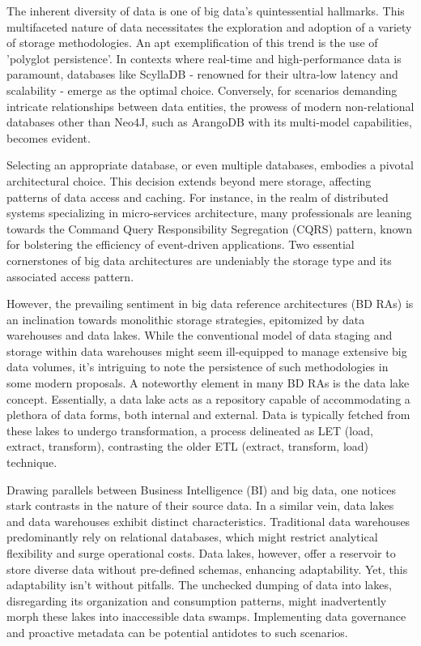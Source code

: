 \documentclass[conference]{IEEEtran}
\begin{document}
The inherent diversity of data is one of big data's quintessential hallmarks. This multifaceted nature of data necessitates the exploration and adoption of a variety of storage methodologies. An apt exemplification of this trend is the use of 'polyglot persistence'. In contexts where real-time and high-performance data is paramount, databases like ScyllaDB - renowned for their ultra-low latency and scalability - emerge as the optimal choice. Conversely, for scenarios demanding intricate relationships between data entities, the prowess of modern non-relational databases other than Neo4J, such as ArangoDB with its multi-model capabilities, becomes evident.

Selecting an appropriate database, or even multiple databases, embodies a pivotal architectural choice. This decision extends beyond mere storage, affecting patterns of data access and caching. For instance, in the realm of distributed systems specializing in micro-services architecture, many professionals are leaning towards the Command Query Responsibility Segregation (CQRS) pattern, known for bolstering the efficiency of event-driven applications. Two essential cornerstones of big data architectures are undeniably the storage type and its associated access pattern.

However, the prevailing sentiment in big data reference architectures (BD RAs) is an inclination towards monolithic storage strategies, epitomized by data warehouses and data lakes. While the conventional model of data staging and storage within data warehouses might seem ill-equipped to manage extensive big data volumes, it's intriguing to note the persistence of such methodologies in some modern proposals. A noteworthy element in many BD RAs is the data lake concept. Essentially, a data lake acts as a repository capable of accommodating a plethora of data forms, both internal and external. Data is typically fetched from these lakes to undergo transformation, a process delineated as LET (load, extract, transform), contrasting the older ETL (extract, transform, load) technique.

Drawing parallels between Business Intelligence (BI) and big data, one notices stark contrasts in the nature of their source data. In a similar vein, data lakes and data warehouses exhibit distinct characteristics. Traditional data warehouses predominantly rely on relational databases, which might restrict analytical flexibility and surge operational costs. Data lakes, however, offer a reservoir to store diverse data without pre-defined schemas, enhancing adaptability. Yet, this adaptability isn't without pitfalls. The unchecked dumping of data into lakes, disregarding its organization and consumption patterns, might inadvertently morph these lakes into inaccessible data swamps. Implementing data governance and proactive metadata can be potential antidotes to such scenarios.
\end{document}
